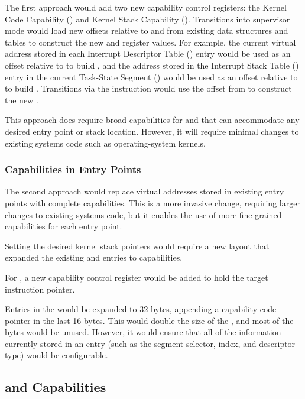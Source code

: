 The first approach would add two new capability control registers: the Kernel
Code Capability (\KCC{}) and Kernel Stack Capability (\KSC{}).  Transitions into
supervisor mode would load new offsets relative to \KCC{} and \KSC{} from
existing data structures and tables to construct the new \CIP{} and \CSP{}
register values.  For example, the current virtual address stored in
each Interrupt Descriptor Table (\IDT{}) entry would be used as an offset
relative to \KCC{} to build \CIP{}, and the address stored in the Interrupt
Stack Table (\IST{}) entry in the current Task-State Segment (\TSS{}) would
be used as an offset relative to \KSC{} to build \CSP{}.  Transitions via
the  instruction would use the offset from \LSTAR{} to
construct the new \CIP{}.

This approach does require broad capabilities
for \KCC{} and \KSC{} that can accommodate any desired entry point or stack
location.  However, it will require minimal changes to existing systems
code such as operating-system kernels.

\subsubsection{Capabilities in Entry Points}

The second approach would replace virtual addresses stored in
existing entry points with complete capabilities.  This is a more
invasive change, requiring larger changes to existing systems code, but
it enables the use of more fine-grained capabilities for each entry
point.

Setting the desired kernel stack pointers \CSP{} would require a new
\TSS{} layout that expanded the existing \RSP{} and \IST{} entries to
capabilities.

For , a new capability control register \CSTAR{} would be
added to hold the target instruction pointer.

Entries in the \IDT{} would be expanded to 32-bytes, appending a capability
code pointer in the last 16 bytes.  This would double the size of the
\IDT{}, and most of the bytes would be unused.  However, it would
ensure that all of the information currently stored in an \IDT{} entry
(such as the segment selector, \IST{} index, and descriptor type) would
be configurable.

\subsection{ and Capabilities}

